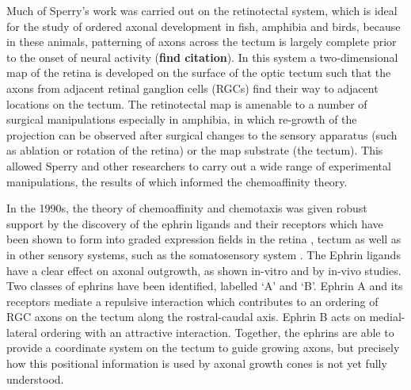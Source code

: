 \documentclass[11pt, a4paper]{article}
\begin{document}
Much of Sperry's work was carried out on the retinotectal system, which is ideal for the study of ordered axonal development in fish, amphibia and birds, because in these animals, patterning of axons across the tectum is largely complete prior to the onset of neural activity (\textbf{find citation}).
In this system a two-dimensional map of the retina is developed on the surface of the optic tectum such that the axons from adjacent retinal ganglion cells (RGCs) find their way to adjacent locations on the tectum. 
The retinotectal map is amenable to a number of surgical manipulations especially in amphibia, in which re-growth of the projection can be observed after surgical changes to the sensory apparatus (such as ablation or rotation of the retina) or the map substrate (the tectum).
This allowed Sperry and other researchers to carry out a wide range of experimental manipulations, the results of which informed the chemoaffinity theory. 

In the 1990s, the theory of chemoaffinity and chemotaxis was given robust support by the discovery of the ephrin ligands and their receptors \citep{cheng_complementary_1995,drescher_vitro_1995} which have been shown to form into graded expression fields in the retina \citep{braisted_graded_1997}, tectum \citep{braisted_graded_1997,feldheim_genetic_2000} as well as in other sensory systems, such as the somatosensory system \citep{vanderhaeghen_mapping_2000}. %
%
The Ephrin ligands have a clear effect on axonal outgrowth, as shown in-vitro \citep{cheng_complementary_1995,drescher_vitro_1995,hansen_retinal_2004} and by in-vivo \citep{frisen_ephrin-a5_1998,rodger_transient_2000,mann_topographic_2002,hindges_ephb_2002} studies.
Two classes of ephrins have been identified, labelled `A' and `B'.
Ephrin A and its receptors mediate a repulsive interaction which contributes to an ordering of RGC axons on the tectum along the rostral-caudal axis. Ephrin B acts on medial-lateral ordering with an attractive interaction. 
Together, the ephrins are able to provide a coordinate system on the tectum to guide growing axons, but precisely how this positional information is used by axonal growth cones is not yet fully understood.
\end{document}
